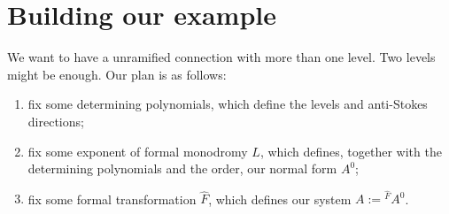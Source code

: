







\section{Building our example}
We want to have a unramified connection with more than one level. Two levels
might be enough. Our plan is as follows:
\begin{enumerate}
  \item fix some determining polynomials, which define the levels and
    anti-Stokes directions;
  \item fix some exponent of formal monodromy $L$, which defines, together with
    the determining polynomials and the order, our normal form $A^0$;
  \item fix some formal transformation $\hat F$, which defines our system
    $A:={}^{\hat F}\!A^0$.
\end{enumerate}

